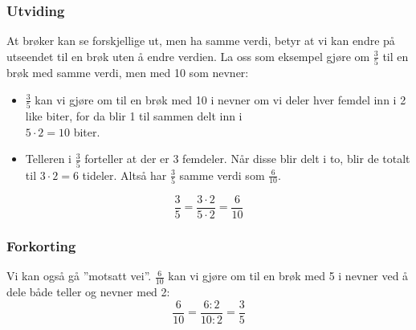 \subsubsection{Utviding}
At brøker kan se forskjellige ut, men ha samme verdi, betyr at vi kan endre på utseendet til en brøk uten å endre verdien. La oss som eksempel gjøre om $ \frac{3}{5} $ til en brøk med samme verdi, men med 10 som nevner:
\begin{itemize}
	\item $ \frac{3}{5} $ kan vi gjøre om til en brøk med 10 i nevner om vi deler hver femdel inn i 2 like biter, for da blir 1 til sammen delt inn i\\ $ {5\cdot2=10} $ biter.
	\item Telleren i $ \frac{3}{5} $ forteller at der er 3 femdeler. Når disse blir delt i to, blir de totalt til $ 3\cdot2=6 $ tideler. Altså har $ \frac{3}{5} $ samme verdi som $ \frac{6}{10} $.
\end{itemize}
\[ \frac{3}{5}=\frac{3\cdot2}{5\cdot2}=\frac{6}{10} \]

\subsubsection{Forkorting}
Vi kan også gå ''motsatt vei''. $ \frac{6}{10} $ kan vi gjøre om til en brøk med 5 i nevner ved å dele både teller og nevner med 2:
\[ \frac{6}{10}=\frac{6:2}{10:2}=\frac{3}{5} \]

\newpage
